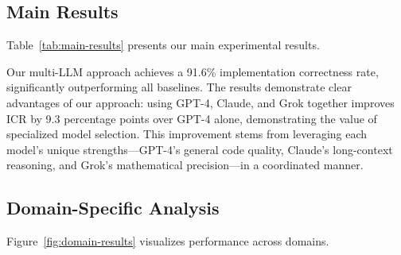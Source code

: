 \documentclass{ieeeaccess}
\begin{document}
\subsection{Main Results}
Table~\ref{tab:main-results} presents our main experimental results.

\begin{table}[!t]
\centering
\caption{Main Experimental Results: Performance Comparison Across Domains}
\label{tab:main-results}
\end{table}

Our multi-LLM approach achieves a 91.6\% implementation correctness rate, significantly outperforming all baselines. The results demonstrate clear advantages of our approach: using GPT-4, Claude, and Grok together improves ICR by 9.3 percentage points over GPT-4 alone, demonstrating the value of specialized model selection. This improvement stems from leveraging each model's unique strengths---GPT-4's general code quality, Claude's long-context reasoning, and Grok's mathematical precision---in a coordinated manner.

\subsection{Domain-Specific Analysis}
Figure~\ref{fig:domain-results} visualizes performance across domains.
\end{document}
